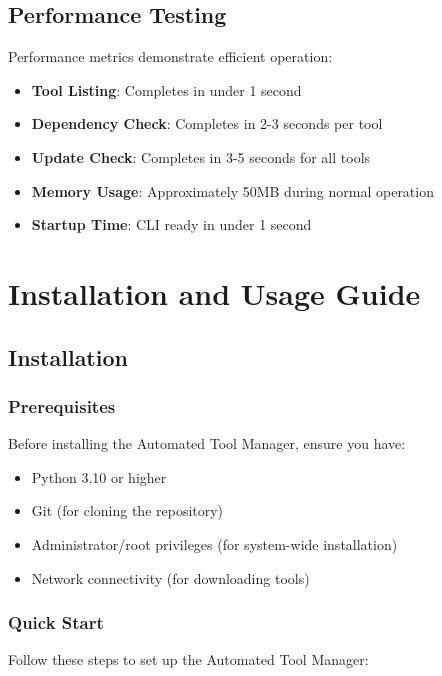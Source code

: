 \documentclass[12pt,a4paper]{report}
\begin{document}
\section{Performance Testing}
Performance metrics demonstrate efficient operation:

\begin{itemize}
    \item \textbf{Tool Listing}: Completes in under 1 second
    \item \textbf{Dependency Check}: Completes in 2-3 seconds per tool
    \item \textbf{Update Check}: Completes in 3-5 seconds for all tools
    \item \textbf{Memory Usage}: Approximately 50MB during normal operation
    \item \textbf{Startup Time}: CLI ready in under 1 second
\end{itemize}

\chapter{Installation and Usage Guide}
\section{Installation}
\subsection{Prerequisites}
Before installing the Automated Tool Manager, ensure you have:
\begin{itemize}
    \item Python 3.10 or higher
    \item Git (for cloning the repository)
    \item Administrator/root privileges (for system-wide installation)
    \item Network connectivity (for downloading tools)
\end{itemize}

\subsection{Quick Start}
Follow these steps to set up the Automated Tool Manager:
\end{document}
